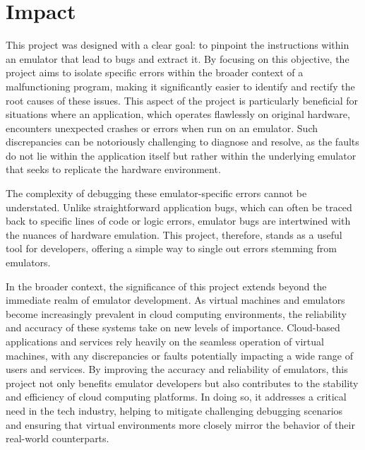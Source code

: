 \section{Impact}
This project was designed with a clear goal: to pinpoint the instructions within an emulator that lead to bugs and extract it.
By focusing on this objective, the project aims to isolate specific errors within the broader context of a malfunctioning program, making it significantly easier to identify and rectify the root causes of these issues.
This aspect of the project is particularly beneficial for situations where an application, which operates flawlessly on original hardware, encounters unexpected crashes or errors when run on an emulator.
Such discrepancies can be notoriously challenging to diagnose and resolve, as the faults do not lie within the application itself but rather within the underlying emulator that seeks to replicate the hardware environment.

The complexity of debugging these emulator-specific errors cannot be understated.
Unlike straightforward application bugs, which can often be traced back to specific lines of code or logic errors, emulator bugs are intertwined with the nuances of hardware emulation.
This project, therefore, stands as a useful tool for developers, offering a simple way to single out errors stemming from emulators.

In the broader context, the significance of this project extends beyond the immediate realm of emulator development.
As virtual machines and emulators become increasingly prevalent in cloud computing environments, the reliability and accuracy of these systems take on new levels of importance.
Cloud-based applications and services rely heavily on the seamless operation of virtual machines, with any discrepancies or faults potentially impacting a wide range of users and services.
By improving the accuracy and reliability of emulators, this project not only benefits emulator developers but also contributes to the stability and efficiency of cloud computing platforms.
In doing so, it addresses a critical need in the tech industry, helping to mitigate challenging debugging scenarios and ensuring that virtual environments more closely mirror the behavior of their real-world counterparts.

